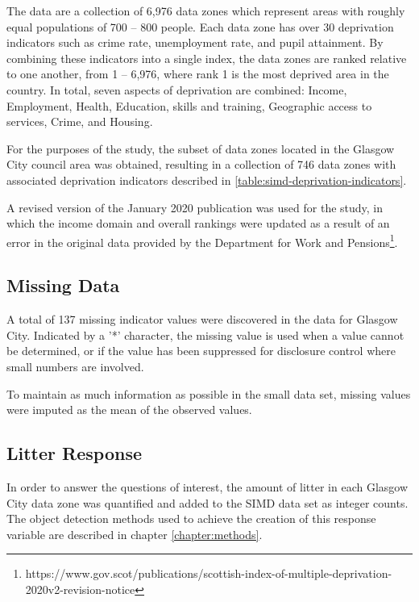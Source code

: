\documentclass{thesis}
\begin{document}
The data are a collection of 6,976 data zones which represent areas with roughly equal populations of 700 -- 800 people. Each data zone has over 30 deprivation indicators such as crime rate, unemployment rate, and pupil attainment. By combining these indicators into a single index, the data zones are ranked relative to one another, from 1 -- 6,976, where rank 1 is the most deprived area in the country. In total, seven aspects of deprivation are combined: Income, Employment, Health, Education, skills and training, Geographic access to services, Crime, and Housing.

For the purposes of the study, the subset of data zones located in the Glasgow City council area was obtained, resulting in a collection of 746 data zones with associated deprivation indicators described in \ref{table:simd-deprivation-indicators}.

A revised version of the January 2020 publication was used for the study, in which the income domain and overall rankings were updated as a result of an error in the original data provided by the Department for Work and Pensions\footnote{https://www.gov.scot/publications/scottish-index-of-multiple-deprivation-2020v2-revision-notice}.

\subsection*{Missing Data}

A total of 137 missing indicator values were discovered in the data for Glasgow City. Indicated by a '*' character, the missing value is used when a value cannot be determined, or if the value has been suppressed for disclosure control where small numbers are involved.

To maintain as much information as possible in the small data set, missing values were imputed as the mean of the observed values.

\subsection*{Litter Response}

In order to answer the questions of interest, the amount of litter in each Glasgow City data zone was quantified and added to the SIMD data set as integer counts. The object detection methods used to achieve the creation of this response variable are  described in chapter \ref{chapter:methods}.
\end{document}
